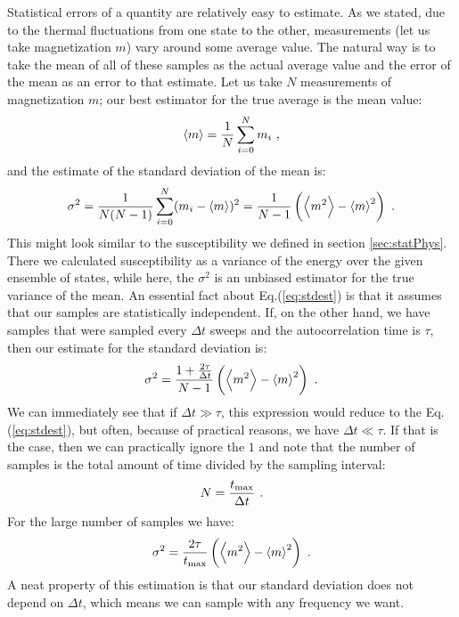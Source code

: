 \par
Statistical errors of a quantity are relatively easy to estimate. As we stated, due to the thermal fluctuations from one state to the other, measurements (let us take magnetization $m$) vary around some average value. The natural way is to take the mean of all of these samples as the actual average value and the error of the mean as an error to that estimate. Let us take $N$ measurements of magnetization $m$; our best estimator for the true average is the mean value:
\begin{equation}
	\expval{m} = \frac{1}{N} \sum_{i=0}^N m_i \ ,
\end{equation}
and the estimate of the standard deviation of the mean is:
\begin{equation}
	\sigma^2 = \frac{1}{N(N-1)}\sum_{i=0}^N (m_i - \expval{m})^2 = \frac{1}{N-1} \left ( \expval{m^2} - \expval{m}^2 \right ) \ .
	\label{eq:stdest}
\end{equation}
This might look similar to the susceptibility we defined in section \ref{sec:statPhys}. There we calculated susceptibility as a variance of the energy over the given ensemble of states, while here, the $\sigma^2$ is an unbiased estimator for the true variance of the mean. An essential fact about Eq.(\ref{eq:stdest}) is that it assumes that our samples are statistically independent. If, on the other hand, we have samples that were sampled every $\Delta t$ sweeps and the autocorrelation time is $\tau$, then our estimate for the standard deviation is\cite{newman1999monte}:
\begin{equation}
	\sigma^2 = \frac{1 + \frac{2\tau}{\Delta t}}{N-1}\left (\expval{m^2}-\expval{m}^2 \right) \ .
\end{equation}
We can immediately see that if $\Delta t \gg \tau$, this expression would reduce to the Eq.(\ref{eq:stdest}), but often, because of practical reasons, we have $\Delta t \ll \tau$. If that is the case, then we can practically ignore the $1$ and note that the number of samples is the total amount of time divided by the sampling interval:
\begin{equation*}
	N = \frac{t_{\text{max}}}{\Delta t} \ .
\end{equation*}
For the large number of samples we have:
\begin{equation}
	\sigma^2 = \frac{2\tau}{t_{\text{max}}}\left(\expval{m^2}-\expval{m}^2 \right) \ .
\end{equation}
A neat property of this estimation is that our standard deviation does not depend on $\Delta t$, which means we can sample with any frequency we want.
